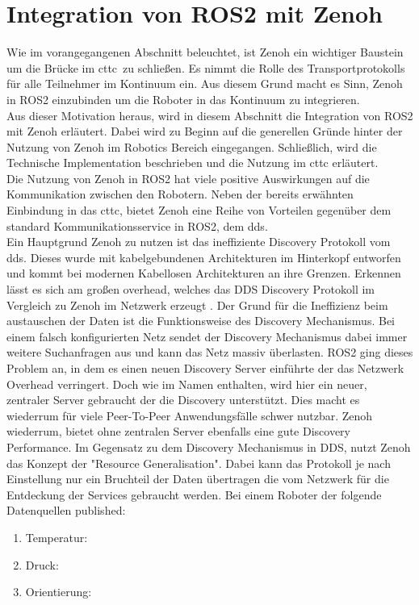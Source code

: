 \section{Integration von ROS2 mit Zenoh} %
\label{sec:Integration von ROS2 mit Zenoh}

Wie im vorangegangenen Abschnitt beleuchtet, ist Zenoh ein wichtiger Baustein um die Brücke im \acrlong{cttc} zu schließen. Es nimmt die Rolle des Transportprotokolls für alle Teilnehmer im Kontinuum ein. Aus diesem Grund macht es Sinn, Zenoh in ROS2 einzubinden um die Roboter in das Kontinuum zu integrieren.\\
Aus dieser Motivation heraus, wird in diesem Abschnitt die Integration von ROS2 mit Zenoh erläutert. Dabei wird zu Beginn auf die generellen Gründe hinter der Nutzung von Zenoh im Robotics Bereich eingegangen. Schließlich, wird die Technische Implementation beschrieben und die Nutzung im \acrlong{cttc} erläutert.\\

Die Nutzung von Zenoh in ROS2 hat viele positive Auswirkungen auf die Kommunikation zwischen den Robotern. Neben der bereits erwähnten Einbindung in das \acrlong{cttc}, bietet Zenoh eine Reihe von Vorteilen gegenüber dem standard Kommunikationsservice in ROS2, dem \acrlong{dds}.\\

Ein Hauptgrund Zenoh zu nutzen ist das ineffiziente Discovery Protokoll vom \acrlong{dds}. Dieses wurde mit kabelgebundenen Architekturen im Hinterkopf entworfen und kommt bei modernen Kabellosen Architekturen an ihre Grenzen. Erkennen lässt es sich am großen overhead, welches das DDS Discovery Protokoll im Vergleich zu Zenoh im Netzwerk erzeugt \cite{ZenohZeroOverhead2022}. Der Grund für die Ineffizienz beim austauschen der Daten ist die Funktionsweise des Discovery Mechanismus. Bei einem falsch konfigurierten Netz sendet der Discovery Mechanismus dabei immer weitere Suchanfragen aus und kann das Netz massiv überlasten. ROS2 ging dieses Problem an, in dem es einen neuen Discovery Server \cite{DiscoveryServerSettings} einführte der das Netzwerk Overhead verringert. Doch wie im Namen enthalten, wird hier ein neuer, zentraler Server gebraucht der die Discovery unterstützt. Dies macht es wiederrum für viele Peer-To-Peer Anwendungsfälle schwer nutzbar. Zenoh wiederrum, bietet ohne zentralen Server ebenfalls eine gute Discovery Performance. Im Gegensatz zu dem Discovery Mechanismus in DDS, nutzt Zenoh das Konzept der "Resource Generalisation"\cite{ZenohZeroOverhead2022}. Dabei kann das Protokoll je nach Einstellung nur ein Bruchteil der Daten übertragen die vom Netzwerk für die Entdeckung der Services gebraucht werden. Bei einem Roboter der folgende Datenquellen published:
\begin{enumerate}
  \item Temperatur: 
  \item Druck: 
  \item Orientierung: 
\end{enumerate}

